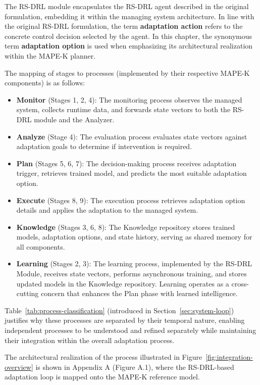 \documentclass[11pt,a4paper]{article}
\begin{document}
The RS-DRL module encapsulates the RS-DRL agent described in the original formulation, embedding it within the managing system architecture. In line with the original RS-DRL formulation, the term \textbf{adaptation action} refers to the concrete control decision selected by the agent. In this chapter, the synonymous term \textbf{adaptation option} is used when emphasizing its architectural realization within the MAPE-K planner.

The mapping of stages to processes (implemented by their respective MAPE-K components) is as follows:

\begin{itemize}
    \item \textbf{Monitor} (Stages 1, 2, 4): The monitoring process observes the managed system, collects runtime data, and forwards state vectors to both the RS-DRL module and the Analyzer.
    \item \textbf{Analyze} (Stage 4): The evaluation process evaluates state vectors against adaptation goals to determine if intervention is required.
    \item \textbf{Plan} (Stages 5, 6, 7): The decision-making process receives adaptation trigger, retrieves trained model, and predicts the most suitable adaptation option.
    \item \textbf{Execute} (Stages 8, 9): The execution process retrieves adaptation option details and applies the adaptation to the managed system.
    \item \textbf{Knowledge} (Stages 3, 6, 8): The Knowledge repository stores trained models, adaptation options, and state history, serving as shared memory for all components.
    \item \textbf{Learning} (Stages 2, 3): The learning process, implemented by the RS-DRL Module, receives state vectors, performs asynchronous training, and stores updated models in the Knowledge repository. Learning operates as a cross-cutting concern that enhances the Plan phase with learned intelligence.
\end{itemize}

Table~\ref{tab:process-classification} (introduced in Section~\ref{sec:system-loop}) justifies why these processes are separated by their temporal nature, enabling independent processes to be understood and refined separately while maintaining their integration within the overall adaptation process.

The architectural realization of the process illustrated in Figure~\ref{fig:integration-overview} is shown in Appendix A (Figure A.1), where the RS-DRL-based adaptation loop is mapped onto the MAPE-K reference model.
\end{document}
